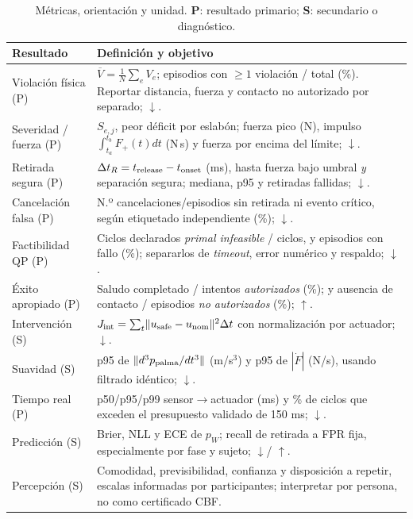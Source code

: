 \documentclass[10pt,a4paper,twocolumn]{article}
\begin{document}
\begin{table}[!t]
\centering\footnotesize
\caption{Métricas, orientación y unidad. \textbf{P}: resultado primario; \textbf{S}: secundario o diagnóstico.}
\vspace{2pt}
\begin{tabularx}{\textwidth}{@{}p{43mm}X@{}}
\toprule
\textbf{Resultado} & \textbf{Definición y objetivo}\\
\midrule
Violación física (P) & $\overline V=\frac1{N}\sum_e V_e$; episodios con $\geq1$ violación / total (\%). Reportar distancia, fuerza y contacto no autorizado por separado; $\downarrow$.\\
Severidad / fuerza (P) & $S_{e,j}$, peor déficit por eslabón; fuerza pico (N), impulso $\int_{t_a}^{t_b}\!F_+(t)dt$ (N\,s) y fuerza por encima del límite; $\downarrow$.\\
Retirada segura (P) & $\Delta t_R=t_{\rm release}-t_{\rm onset}$ (ms), hasta fuerza bajo umbral \emph{y} separación segura; mediana, p95 y retiradas fallidas; $\downarrow$.\\
Cancelación falsa (P) & N.º cancelaciones/episodios sin retirada ni evento crítico, según etiquetado independiente (\%); $\downarrow$.\\
Factibilidad QP (P) & Ciclos declarados \emph{primal infeasible} / ciclos, y episodios con fallo (\%); separarlos de \emph{timeout}, error numérico y respaldo; $\downarrow$.\\
Éxito apropiado (P) & Saludo completado / intentos \emph{autorizados} (\%); y ausencia de contacto / episodios \emph{no autorizados} (\%); $\uparrow$.\\
Intervención (S) & $J_{\rm int}=\sum_t\!\|u_{\rm safe}-u_{\rm nom}\|^2\Delta t$ con normalización por actuador; $\downarrow$.\\
Suavidad (S) & p95 de $\|d^3p_{\rm palma}/dt^3\|$ (m/s$^3$) y p95 de $|\dot F|$ (N/s), usando filtrado idéntico; $\downarrow$.\\
Tiempo real (P) & p50/p95/p99 sensor$\to$actuador (ms) y \% de ciclos que exceden el presupuesto validado de 150 ms; $\downarrow$.\\
Predicción (S) & Brier, NLL y ECE de $p_W$; recall de retirada a FPR fija, especialmente por fase y sujeto; $\downarrow$/ $\uparrow$.\\
Percepción (S) & Comodidad, previsibilidad, confianza y disposición a repetir, escalas informadas por participantes; interpretar por persona, no como certificado CBF.\\
\bottomrule
\end{tabularx}
\label{tab:metric_defs}
\end{table}
\end{document}
